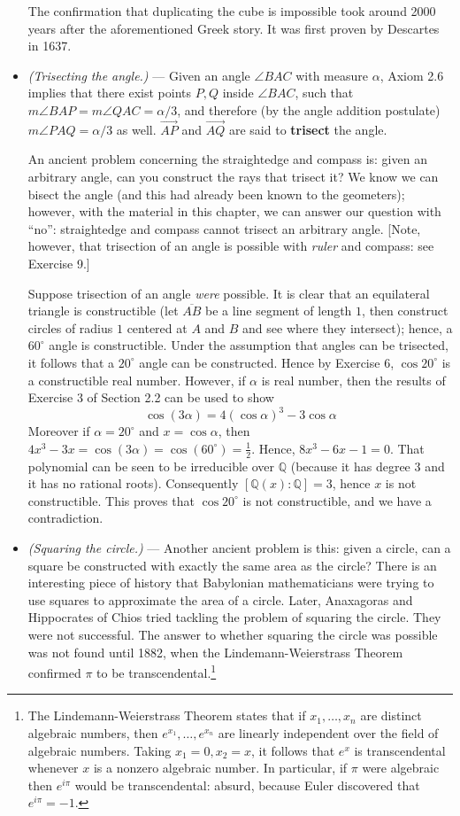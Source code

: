 \documentclass[leqno]{book}
\begin{document}
\begin{itemize}
The confirmation that duplicating the cube is impossible took around 2000 years after the aforementioned Greek story.  It was first proven by Descartes in 1637.

\item\emph{(Trisecting the angle.)} \---- Given an angle $\angle BAC$ with measure $\alpha$, Axiom 2.6 implies that there exist points $P,Q$ inside $\angle BAC$, such that $m\angle BAP=m\angle QAC=\alpha/3$, and therefore (by the angle addition postulate) $m\angle PAQ=\alpha/3$ as well.  $\overset{\longrightarrow}{AP}$ and $\overset{\longrightarrow}{AQ}$ are said to \textbf{trisect} the angle.

An ancient problem concerning the straightedge and compass is: given an arbitrary angle, can you construct the rays that trisect it?  We know we can bisect the angle (and this had already been known to the geometers); however, with the material in this chapter, we can answer our question with ``no'': straightedge and compass cannot trisect an arbitrary angle.  [Note, however, that trisection of an angle is possible with \emph{ruler} and compass: see Exercise 9.]

Suppose trisection of an angle \emph{were} possible.  It is clear that an equilateral triangle is constructible (let $\overline{AB}$ be a line segment of length $1$, then construct circles of radius $1$ centered at $A$ and $B$ and see where they intersect); hence, a $60^\circ$ angle is constructible.  Under the assumption that angles can be trisected, it follows that a $20^\circ$ angle can be constructed.  Hence by Exercise 6, $\cos 20^\circ$ is a constructible real number.  However, if $\alpha$ is real number, then the results of Exercise 3 of Section 2.2 can be used to show
$$\cos(3\alpha)=4(\cos\alpha)^3-3\cos\alpha$$
Moreover if $\alpha=20^\circ$ and $x=\cos\alpha$, then $4x^3-3x=\cos(3\alpha)=\cos(60^\circ)=\frac 12$.  Hence, $8x^3-6x-1=0$.  That polynomial can be seen to be irreducible over $\mathbb Q$ (because it has degree $3$ and it has no rational roots).  Consequently $[\mathbb Q(x):\mathbb Q]=3$, hence $x$ is not constructible.  This proves that $\cos 20^\circ$ is not constructible, and we have a contradiction.

\item\emph{(Squaring the circle.)} \---- Another ancient problem is this: given a circle, can a square be constructed with exactly the same area as the circle?  There is an interesting piece of history that Babylonian mathematicians were trying to use squares to approximate the area of a circle.  Later, Anaxagoras and Hippocrates of Chios tried tackling the problem of squaring the circle.  They were not successful.  The answer to whether squaring the circle was possible was not found until 1882, when the Lindemann-Weierstrass Theorem confirmed $\pi$ to be transcendental.\footnote{The Lindemann-Weierstrass Theorem states that if $x_1,\dots,x_n$ are distinct algebraic numbers, then $e^{x_1},\dots,e^{x_n}$ are linearly independent over the field of algebraic numbers.  Taking $x_1=0,x_2=x$, it follows that $e^x$ is transcendental whenever $x$ is a nonzero algebraic number.  In particular, if $\pi$ were algebraic then $e^{i\pi}$ would be transcendental: absurd, because Euler discovered that $e^{i\pi}=-1$.}


\end{itemize}
\end{document}
